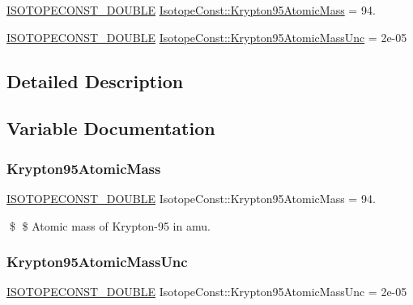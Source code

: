 \begin{DoxyCompactItemize}
\item 
\mbox{\hyperlink{group___isotope_const-_macros_ga8f45a7272ce02c0b4c65c44636ed719a}{I\+S\+O\+T\+O\+P\+E\+C\+O\+N\+S\+T\+\_\+\+D\+O\+U\+B\+LE}} \mbox{\hyperlink{group___isotope_const-_krypton-_kr95_ga7d6cd3d00f735dffda5e78576831ed19}{Isotope\+Const\+::\+Krypton95\+Atomic\+Mass}} = 94.
\item 
\mbox{\hyperlink{group___isotope_const-_macros_ga8f45a7272ce02c0b4c65c44636ed719a}{I\+S\+O\+T\+O\+P\+E\+C\+O\+N\+S\+T\+\_\+\+D\+O\+U\+B\+LE}} \mbox{\hyperlink{group___isotope_const-_krypton-_kr95_ga102f67f3e1f04579e6ec6914e8083785}{Isotope\+Const\+::\+Krypton95\+Atomic\+Mass\+Unc}} = 2e-\/05
\end{DoxyCompactItemize}


\subsection{Detailed Description}


\subsection{Variable Documentation}
\mbox{\label{group___isotope_const-_krypton-_kr95_ga7d6cd3d00f735dffda5e78576831ed19}} 
\subsubsection{\texorpdfstring{Krypton95\+Atomic\+Mass}{Krypton95AtomicMass}}
{\footnotesize\ttfamily \mbox{\hyperlink{group___isotope_const-_macros_ga8f45a7272ce02c0b4c65c44636ed719a}{I\+S\+O\+T\+O\+P\+E\+C\+O\+N\+S\+T\+\_\+\+D\+O\+U\+B\+LE}} Isotope\+Const\+::\+Krypton95\+Atomic\+Mass = 94.}

\$ \$ Atomic mass of Krypton-\/95 in amu. \mbox{\label{group___isotope_const-_krypton-_kr95_ga102f67f3e1f04579e6ec6914e8083785}} 
\subsubsection{\texorpdfstring{Krypton95\+Atomic\+Mass\+Unc}{Krypton95AtomicMassUnc}}
{\footnotesize\ttfamily \mbox{\hyperlink{group___isotope_const-_macros_ga8f45a7272ce02c0b4c65c44636ed719a}{I\+S\+O\+T\+O\+P\+E\+C\+O\+N\+S\+T\+\_\+\+D\+O\+U\+B\+LE}} Isotope\+Const\+::\+Krypton95\+Atomic\+Mass\+Unc = 2e-\/05}

